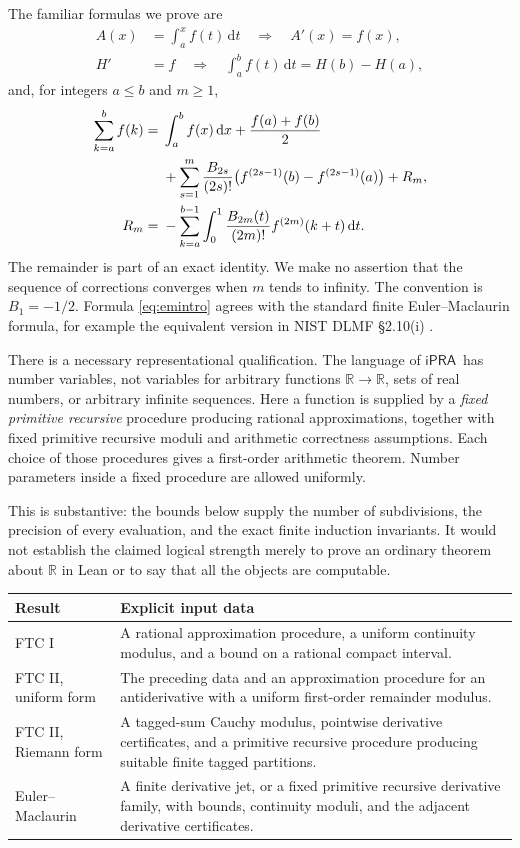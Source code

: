 \documentclass[11pt]{article}
\theoremstyle{definition}
\newcommand{\R}{\mathbb R}
\newcommand{\ipra}{\ensuremath{\mathsf{iPRA}}}
\newcommand{\dd}{\,\mathrm{d}}
\begin{document}
The familiar formulas we prove are
\begin{align}
 A(x)&=\int_a^x f(t)\dd t \quad\Longrightarrow\quad A'(x)=f(x),
 \label{eq:ftc1intro}\\
 H'&=f \quad\Longrightarrow\quad
 \int_a^b f(t)\dd t=H(b)-H(a),\label{eq:ftc2intro}
\end{align}
and, for integers \(a\le b\) and \(m\ge1\),
\begin{align}
 \sum_{k=a}^{b}f(k)
 ={}&\int_a^b f(x)\dd x+\frac{f(a)+f(b)}2\notag\\
 &+\sum_{s=1}^{m}\frac{B_{2s}}{(2s)!}
       \bigl(f^{(2s-1)}(b)-f^{(2s-1)}(a)\bigr)+R_m,\label{eq:emintro}\\
 R_m={}&-\sum_{k=a}^{b-1}\int_0^1
       \frac{B_{2m}(t)}{(2m)!}f^{(2m)}(k+t)\dd t.\label{eq:rintro}
\end{align}
The remainder is part of an exact identity.  We make no assertion that
the sequence of corrections converges when \(m\) tends to infinity.
The convention is \(B_1=-1/2\).  Formula \eqref{eq:emintro} agrees with
the standard finite Euler--Maclaurin formula, for example the equivalent
version in NIST DLMF \S2.10(i) \cite{dlmfem}.

There is a necessary representational qualification.  The language of
\ipra\ has number variables, not variables for arbitrary functions
\(\R\to\R\), sets of real numbers, or arbitrary infinite sequences.
Here a function is supplied by a \emph{fixed primitive recursive}
procedure producing rational approximations, together with fixed
primitive recursive moduli and arithmetic correctness assumptions.
Each choice of those procedures gives a first-order arithmetic theorem.
Number parameters inside a fixed procedure are allowed uniformly.

This is substantive: the bounds below supply the number of subdivisions,
the precision of every evaluation, and the exact finite induction
invariants.  It would not establish the claimed logical strength merely
to prove an ordinary theorem about \(\R\) in Lean or to say that all the
objects are computable.

\begin{center}
\begin{tabular}{>{\raggedright\arraybackslash}p{}>{\raggedright\arraybackslash}p{}}
\toprule
Result & Explicit input data\\\midrule
FTC I & A rational approximation procedure, a uniform continuity modulus,
and a bound on a rational compact interval.\\
FTC II, uniform form & The preceding data and an approximation procedure
for an antiderivative with a uniform first-order remainder modulus.\\
FTC II, Riemann form & A tagged-sum Cauchy modulus, pointwise derivative
certificates, and a primitive recursive procedure producing suitable
finite tagged partitions.\\
Euler--Maclaurin & A finite derivative jet, or a fixed primitive recursive
derivative family, with bounds, continuity moduli, and the adjacent
derivative certificates.\\
\bottomrule
\end{tabular}
\end{center}
\end{document}

